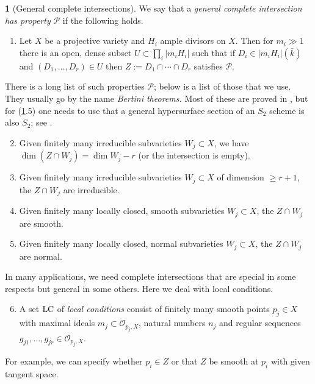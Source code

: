 \documentclass{amsart}
\theoremstyle{definition}
\newtheorem{say}[thm]{}
\theoremstyle{remark}
\renewcommand{\o}[0]{{\mathcal O}}
\begin{document}
\begin{say}[General  complete intersections] \label{gen.ci.say}
We say that a 
{\it general  complete intersection has property} ${\mathcal P}$ if the following holds.
\begin{enumerate}
\item Let $X$ be a  projective  variety and $H_i$ ample divisors on $X$.
Then for $m_i\gg 1$ there is an open, dense subset
$U\subset \prod_i |m_iH_i|$ such that if $D_i\in |m_iH_i|(\bar k)$ and
$(D_1,\dots, D_r)\in U$  then
$Z:= D_1\cap\cdots\cap D_r$ satisfies ${\mathcal P}$.
\end{enumerate}
There is a long list of such properties ${\mathcal P}$; below is a  list of those that we use. They usually go by the name  {\it Bertini theorems.} Most of these are proved in 
\cite[II.8.18, III.10.9]{hartsh}, but for (\ref{gen.ci.say}.5) one needs to use that a general hypersurface section of an $S_2$ scheme is also $S_2$; see
\cite[IV.12.1.6]{ega}.

\begin{enumerate}\setcounter{enumi}{1}
\item  Given finitely many irreducible subvarieties  $W_j\subset X$, we have $\dim (Z\cap W_j) = \dim W_j-r$  (or the intersection is empty).
\item  Given finitely many irreducible subvarieties  $W_j\subset X$ of dimension $\geq r+1$, the $Z\cap W_j$ are irreducible.
\item Given finitely many locally closed, smooth subvarieties $W_j\subset X$,
the $Z\cap W_j$ are smooth.
\item Given finitely many locally closed, normal subvarieties $W_j\subset X$,
the $Z\cap W_j$ are normal.
\end{enumerate}




In many applications, we need complete intersections that are special in some respects but general in some others.  Here we deal with local conditions.
\begin{enumerate}\setcounter{enumi}{5}
\item A set ${\rm LC}$  of {\it local conditions} consist of  finitely many smooth points  $p_j\in X$ with maximal ideals
$m_j\subset \o_{p_j,X}$, natural numbers $n_j$  and  regular sequences
$g_{j1},\dots,g_{jr} \in \o_{p_j,X}$.  
\end{enumerate}
For example, we can specify whether $p_i\in Z$ or that $Z$ be smooth at $p_i$ with given tangent space.


\end{say}
\end{document}
